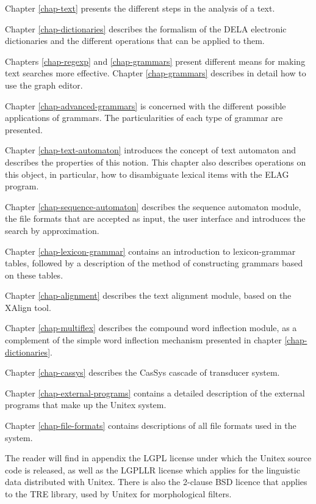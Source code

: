 \bigskip \noindent Chapter \ref{chap-text} presents the different steps in the
analysis of  a text.

\bigskip \noindent Chapter \ref{chap-dictionaries} describes the formalism of
the DELA electronic dictionaries and the different operations that can be applied to them.

\bigskip \noindent Chapters \ref{chap-regexp} and \ref{chap-grammars}
present different means for making text searches more effective. 
Chapter \ref{chap-grammars} describes in detail how to use the graph
editor.

\bigskip \noindent Chapter \ref{chap-advanced-grammars} is concerned
with the different possible applications of grammars. The particularities of each type of grammar are
presented.

\bigskip \noindent Chapter \ref{chap-text-automaton} introduces the 
concept of text automaton and describes the properties of this notion. This chapter also describes 
operations on this object, in particular, how to disambiguate lexical items with
the ELAG program.

\bigskip \noindent Chapter \ref{chap-sequence-automaton} describes the sequence automaton module, the file formats that are accepted as input, the user interface and introduces the search by approximation.

\bigskip \noindent Chapter \ref{chap-lexicon-grammar} contains an
introduction to lexicon-grammar tables, followed by a description of the method of constructing grammars based on these
tables.

\bigskip \noindent Chapter \ref{chap-alignment} describes the text
alignment module, based on the XAlign tool.

\bigskip \noindent Chapter \ref{chap-multiflex} describes the compound word
inflection module, as a complement of the simple word inflection mechanism
presented in chapter \ref{chap-dictionaries}.

\bigskip \noindent Chapter \ref{chap-cassys} describes the CasSys cascade of transducer system.

\bigskip \noindent Chapter \ref{chap-external-programs} contains a
detailed description of the external programs that make up the Unitex system.

\bigskip \noindent Chapter \ref{chap-file-formats} contains
descriptions of all file formats used in the system. 


\bigskip \noindent The reader will find in appendix the LGPL license
under which the Unitex source code is released, as well as the LGPLLR license
which applies for the linguistic data distributed with Unitex. There is also
the 2-clause BSD licence that applies to the TRE library, used by Unitex for 
morphological filters.


